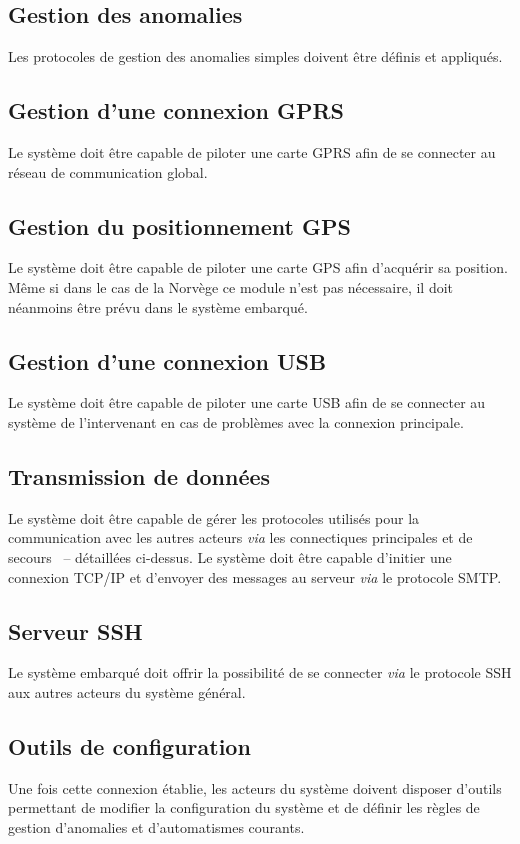\documentclass[a4paper, 11pt, final]{article}
\begin{document}
\subsection{Gestion des anomalies}
Les protocoles de gestion des anomalies simples doivent être définis et appliqués.



\subsection{Gestion d'une connexion GPRS}
Le système doit être capable de piloter une carte GPRS afin de se connecter au réseau de communication global.
\subsection{Gestion du positionnement GPS}
Le système doit être capable de piloter une carte GPS afin d'acquérir sa position. Même si dans le cas de la Norvège ce module n'est pas nécessaire, il doit néanmoins être prévu dans le système embarqué.
\subsection{Gestion d'une connexion USB}
Le système doit être capable de piloter une carte USB afin de se connecter au système de l'intervenant en cas de problèmes avec la connexion principale.
\subsection{Transmission de données}
Le système doit être capable de gérer les protocoles utilisés pour la communication avec les autres acteurs \emph{via} les connectiques principales et de secours ~-- détaillées ci-dessus. Le système doit être capable d'initier une connexion TCP/IP et d'envoyer des messages au serveur \emph{via} le protocole SMTP.

\subsection{Serveur SSH}
Le système embarqué doit offrir la possibilité de se connecter \emph{via} le protocole SSH aux autres acteurs du système général.
\subsection{Outils de configuration}
Une fois cette connexion établie, les acteurs du système doivent disposer d'outils permettant de modifier la configuration du système et de définir les règles de gestion d'anomalies et d'automatismes courants.
	
\end{document}
